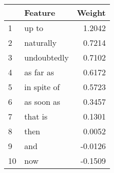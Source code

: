 \begin{tabular}{llr}
\toprule
{} &      Feature &  Weight \\
\midrule
1  &        up to &  1.2042 \\
2  &    naturally &  0.7214 \\
3  &  undoubtedly &  0.7102 \\
4  &    as far as &  0.6172 \\
5  &  in spite of &  0.5723 \\
6  &   as soon as &  0.3457 \\
7  &      that is &  0.1301 \\
8  &         then &  0.0052 \\
9  &          and & -0.0126 \\
10 &          now & -0.1509 \\
\bottomrule
\end{tabular}

